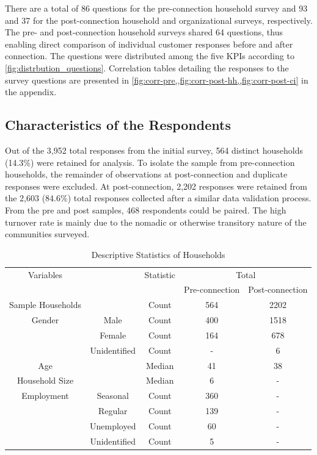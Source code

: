 There are a total of 86 questions for the pre-connection household survey and 93 and 37 for the post-connection household and organizational surveys, respectively. The pre- and post-connection household surveys shared 64 questions, thus enabling direct comparison of individual customer responses before and after connection. The questions were distributed among the five KPIs according to \cref{fig:distrbution_questions}. Correlation tables detailing the responses to the survey questions are presented in \cref{fig:corr-pre,,fig:corr-post-hh,,fig:corr-post-ci} in the appendix.

\subsection{Characteristics of the Respondents}
Out of the 3,952 total responses from the initial survey, 564 distinct households (14.3\%) were retained for analysis. To isolate the sample from pre-connection households, the remainder of observations at post-connection and duplicate responses were excluded. At post-connection, 2,202 responses were retained from the 2,603 (84.6\%) total responses collected after a similar data validation process. From the pre and post samples, 468 respondents could be paired. The high turnover rate is mainly due to the nomadic or otherwise transitory nature of the communities surveyed.


\begin{table}[th]
\centering
    \begin{tabular}{*5c} 
        \toprule
        Variables &  & Statistic  &\multicolumn{2}{c}{Total}\\
        & &  & Pre-connection & Post-connection\\
        
        \midrule
        Sample Households  & & Count & 564 & 2202 \\
        Gender  & Male & Count & 400 & 1518\\
                & Female & Count & 164 & 678\\
                & Unidentified & Count & - & 6\\
        Age  &  & Median & 41 & 38\\
        Household Size  &  & Median & 6 & - \\
        Employment & Seasonal & Count & 360 & - \\
                   & Regular & Count & 139 & - \\
                   & Unemployed & Count & 60 & - \\
                   & Unidentified & Count & 5 & -\\
                   
        \bottomrule
    \end{tabular}
\caption{Descriptive Statistics of Households}
\label{tab:desc-stats-hh}
\end{table}

